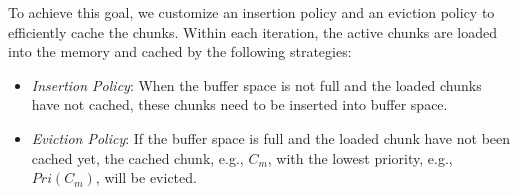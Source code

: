 \documentclass[10pt,journal,compsoc]{IEEEtran}
\begin{document}
To achieve this goal, we customize an insertion policy and an eviction policy to efficiently cache the chunks.
Within each iteration, the active chunks are loaded into the memory and cached by the following strategies:
\vspace{-4pt}
\begin{itemize}
	\item \textit{Insertion Policy}: When the buffer space is not full and the loaded chunks have not cached, these chunks need to be inserted into buffer space.
	\item \textit{Eviction Policy}: If the buffer space is full and the loaded chunk have not been cached yet, the cached chunk, e.g., $C_m$, with the lowest priority, e.g., $Pri(C_m)$, will be evicted.
\end{itemize}
\vspace{-4pt}
\end{document}
